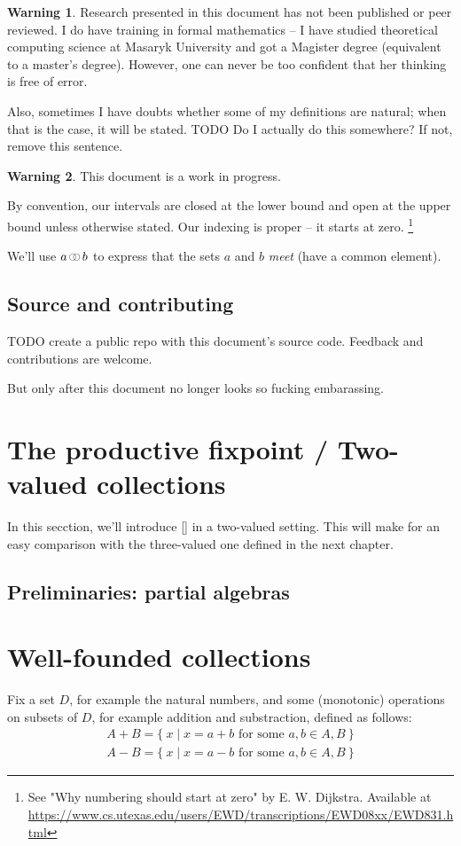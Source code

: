 \documentclass[oneside,12pt]{book}
\theoremstyle{definition}
\newtheorem*{warning}{Warning}
\theoremstyle{remark}
\newcommand\var[1]{\mathop{\mathit{#1}}\nolimits}
\newcommand\Circle{\raisebox{0.45mm}{\scalebox{0.6}{$\bigcirc$}}}
\newcommand{\meet}{\var{\mathrlap{\Circle}\hspace{3.2pt}\Circle}}
\begin{document}
\begin{warning}
  Research presented in this document has not been published or peer reviewed.
  I do have training in formal mathematics -- I have studied theoretical computing
  science at Masaryk University and got a Magister degree (equivalent to a master's degree). However, one can never be too confident that her thinking is free of error.
  
  Also, sometimes I have doubts whether some of my definitions are natural; when
  that is the case, it will be stated.
  TODO Do I actually do this somewhere? If not, remove this sentence.
\end{warning}

\begin{warning}
  This document is a work in progress.
\end{warning}

By convention, our intervals are closed at the lower bound and open at the upper
bound unless otherwise stated. Our indexing is proper -- it starts at zero.%
\footnote{See "Why numbering should start at zero" by E. W. Dijkstra. Available at
\url{https://www.cs.utexas.edu/users/EWD/transcriptions/EWD08xx/EWD831.html}}

We'll use $a \meet b$ to express that the sets $a$ and $b$ \textit{meet} (have
a common element).

\section{Source and contributing}
TODO create a public repo with this document's source code. Feedback and
contributions are welcome.

But only after this document no longer looks so fucking embarassing.


\chapter{The productive fixpoint / Two-valued collections}
In this secction, we'll introduce [] in a two-valued setting. This will make for
an easy comparison with the three-valued one defined in the next chapter.

\section{Preliminaries: partial algebras}


\chapter{Well-founded collections}
Fix a set $D$, for example the natural numbers, and some (monotonic) operations
on subsets of $D$, for example addition and substraction, defined as follows:
%
\begin{gather*}
  A + B = \{~x \mid x = a + b \text{ for some } a,b \in A,B~\} \\
  A - B = \{~x \mid x = a - b \text{ for some } a,b \in A,B~\}
\end{gather*}
\end{document}
